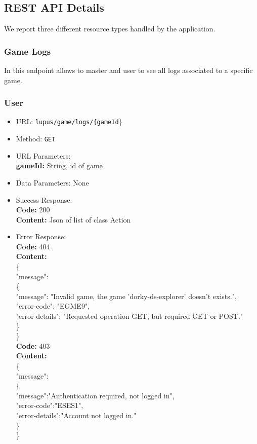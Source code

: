 \newcommand\tab[1][1cm]{\hspace*{#1}}

\subsection{REST API Details}
We report three different resource types handled by the application.

\subsubsection*{Game Logs}
In this endpoint allows to master and user to see all logs associated to a specific game.

\subsubsection*{User}
\begin{itemize}
    \item URL: \texttt{lupus/game/logs/\{gameId}\}
    \item Method: \texttt{GET}
    \item URL Parameters:\\
        \textbf{gameId:} String, id of game
    \item Data Parameters: None
    \item Success Response: \\
        \textbf{Code:} 200\\
        \textbf{Content:} Json of list of class Action
    \item Error Response:\\
        \textbf{Code:} 404\\
        \textbf{Content:}\\
        \{\\
        \tab "message": \\
        \tab \{\\
        \tab \tab "message": "Invalid game, the game 'dorky-ds-explorer' doesn't exists.",\\
        \tab \tab "error-code": "EGME9",\\
        \tab \tab "error-details": "Requested operation GET, but required GET or POST."\\
         \tab \}\\
        \}\\
        \textbf{Code:} 403\\
        \textbf{Content:}\\
        \{\\
         \tab "message":\\
         \tab \{\\
         \tab \tab "message":"Authentication required, not logged in",\\
         \tab \tab "error-code":"ESES1",\\
         \tab \tab "error-details":"Account not logged in."\\
         \tab \}\\
        \}\\
\end{itemize}
